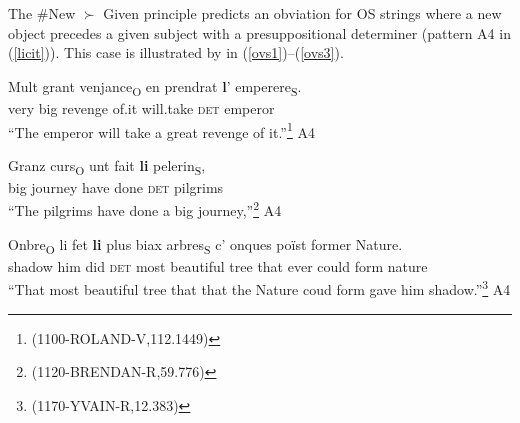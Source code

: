 \documentclass[output=paper,modfonts,nonflat]{langsci/langscibook}
\begin{document}


The \#New $\succ$ Given principle predicts an obviation for OS strings where a new object precedes a given subject with a presuppositional determiner (pattern A4 in (\ref{licit})). This case is illustrated by in (\ref{ovs1})--(\ref{ovs3}).

\ea
\gll Mult grant venjance\textsubscript{O} en prendrat {\bfseries l}' emperere\textsubscript{S}.\\
very big revenge of.it will.take {\scshape det} emperor\\
\glt ``The emperor will take a great revenge of it.''\footnote{ (1100-ROLAND-V,112.1449)}\label{ovs1} \hfill A4
\z



\ea
\gll Granz curs\textsubscript{O} unt fait {\bfseries li} pelerin\textsubscript{S},\\
big journey have done {\scshape det} pilgrims\\
\glt ``The pilgrims have done a big journey,''\footnote{ (1120-BRENDAN-R,59.776)}\label{ovs2} \hfill A4
\z

\ea
\gll Onbre\textsubscript{O} li fet {\bfseries li} plus biax arbres\textsubscript{S} c' onques po\"{i}st former Nature.\\
shadow him did {\scshape det} most beautiful tree that ever could form nature\\
\glt ``That most beautiful tree that that the Nature coud form gave him shadow.''\footnote{ (1170-YVAIN-R,12.383)}\label{ovs3} \hfill A4
\z


\end{document}
